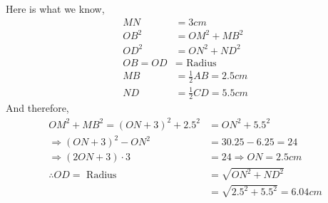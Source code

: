 \begin{solution}
	Here is what we know,
	\begin{align}
		MN &= 3cm \\
		OB^2 &= OM^2 + MB^2 \\
		OD^2 &= ON^2 + ND^2 \\
		OB = OD &= \text{ Radius } \\
		MB &= \frac{1}{2}AB = 2.5cm \\
		ND &= \frac{1}{2}CD = 5.5cm
	\end{align}
	And therefore, 
	\begin{align}
		OM^2 + MB^2 = (ON + 3)^2 + 2.5^2 &= ON^2 + 5.5^2 \\
		\Rightarrow (ON+3)^2 - ON^2 &= 30.25 - 6.25 = 24 \\
		\Rightarrow (2ON + 3)\cdot 3 &= 24 \Rightarrow ON = 2.5cm \\
		\therefore OD = \text{ Radius } &= \sqrt{ON^2 + ND^2} \\ 
		&= \sqrt{2.5^2 + 5.5^2} = 6.04cm
	\end{align}
\end{solution}

